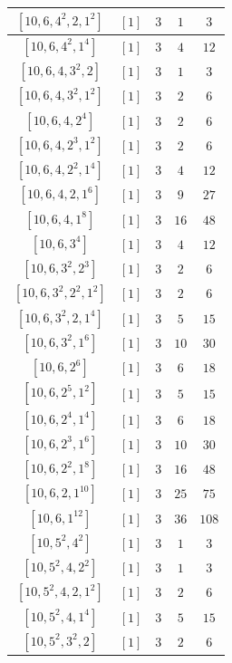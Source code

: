 \documentclass{article}%
\begin{document}
\begin{center}
\begin{longtable}{||c|c|c|c|c||}
$[10, 6, 4^{2}, 2, 1^{2}]$ & $[1]$ & $3$ & $1$ & $3$ \\ \hline 
$[10, 6, 4^{2}, 1^{4}]$ & $[1]$ & $3$ & $4$ & $12$ \\ \hline 
$[10, 6, 4, 3^{2}, 2]$ & $[1]$ & $3$ & $1$ & $3$ \\ \hline 
$[10, 6, 4, 3^{2}, 1^{2}]$ & $[1]$ & $3$ & $2$ & $6$ \\ \hline 
$[10, 6, 4, 2^{4}]$ & $[1]$ & $3$ & $2$ & $6$ \\ \hline 
$[10, 6, 4, 2^{3}, 1^{2}]$ & $[1]$ & $3$ & $2$ & $6$ \\ \hline 
$[10, 6, 4, 2^{2}, 1^{4}]$ & $[1]$ & $3$ & $4$ & $12$ \\ \hline 
$[10, 6, 4, 2, 1^{6}]$ & $[1]$ & $3$ & $9$ & $27$ \\ \hline 
$[10, 6, 4, 1^{8}]$ & $[1]$ & $3$ & $16$ & $48$ \\ \hline 
$[10, 6, 3^{4}]$ & $[1]$ & $3$ & $4$ & $12$ \\ \hline 
$[10, 6, 3^{2}, 2^{3}]$ & $[1]$ & $3$ & $2$ & $6$ \\ \hline 
$[10, 6, 3^{2}, 2^{2}, 1^{2}]$ & $[1]$ & $3$ & $2$ & $6$ \\ \hline 
$[10, 6, 3^{2}, 2, 1^{4}]$ & $[1]$ & $3$ & $5$ & $15$ \\ \hline 
$[10, 6, 3^{2}, 1^{6}]$ & $[1]$ & $3$ & $10$ & $30$ \\ \hline 
$[10, 6, 2^{6}]$ & $[1]$ & $3$ & $6$ & $18$ \\ \hline 
$[10, 6, 2^{5}, 1^{2}]$ & $[1]$ & $3$ & $5$ & $15$ \\ \hline 
$[10, 6, 2^{4}, 1^{4}]$ & $[1]$ & $3$ & $6$ & $18$ \\ \hline 
$[10, 6, 2^{3}, 1^{6}]$ & $[1]$ & $3$ & $10$ & $30$ \\ \hline 
$[10, 6, 2^{2}, 1^{8}]$ & $[1]$ & $3$ & $16$ & $48$ \\ \hline 
$[10, 6, 2, 1^{10}]$ & $[1]$ & $3$ & $25$ & $75$ \\ \hline 
$[10, 6, 1^{12}]$ & $[1]$ & $3$ & $36$ & $108$ \\ \hline 
$[10, 5^{2}, 4^{2}]$ & $[1]$ & $3$ & $1$ & $3$ \\ \hline 
$[10, 5^{2}, 4, 2^{2}]$ & $[1]$ & $3$ & $1$ & $3$ \\ \hline 
$[10, 5^{2}, 4, 2, 1^{2}]$ & $[1]$ & $3$ & $2$ & $6$ \\ \hline 
$[10, 5^{2}, 4, 1^{4}]$ & $[1]$ & $3$ & $5$ & $15$ \\ \hline 
$[10, 5^{2}, 3^{2}, 2]$ & $[1]$ & $3$ & $2$ & $6$ \\ \hline 

\end{longtable}
\end{center}
\end{document}
